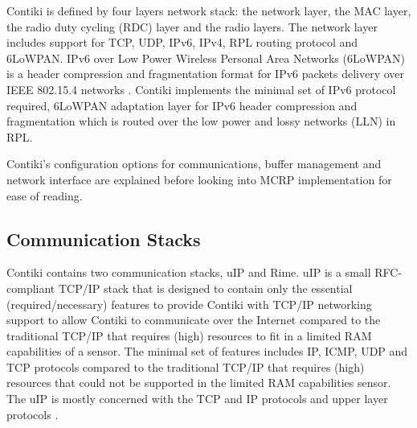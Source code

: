 Contiki is defined by four layers network stack: the network layer, the MAC layer, the radio duty cycling (RDC) layer and the radio layers. The network layer includes support for TCP, UDP, IPv6, IPv4, RPL routing protocol and 6LoWPAN. IPv6 over Low Power Wireless Personal Area Networks (6LoWPAN) is a header compression and fragmentation format for IPv6 packets delivery over IEEE 802.15.4 networks \cite{6lowpan}. Contiki implements the minimal set of IPv6 protocol required, 6LoWPAN adaptation layer for IPv6 header compression and fragmentation which is routed over the low power and lossy networks (LLN) in RPL.

Contiki's configuration options for communications, buffer management and network interface are explained before looking into MCRP implementation for ease of reading.



\subsection{Communication Stacks}
\label{commstack}
Contiki contains two communication stacks, uIP and Rime.
uIP \cite{uip} is a small RFC-compliant TCP/IP stack that is designed to contain only the essential (required/necessary) features to provide Contiki with TCP/IP networking support to allow Contiki to communicate over the Internet compared to the traditional TCP/IP that requires (high) resources to fit in a limited RAM capabilities of a sensor. The minimal set of features includes IP, ICMP, UDP and TCP protocols compared to the traditional TCP/IP that requires (high) resources that could not be supported in the limited RAM capabilities sensor. The uIP is mostly concerned with the TCP and IP protocols and upper layer protocols \cite{contikiDoc, contikiUIP}. 

